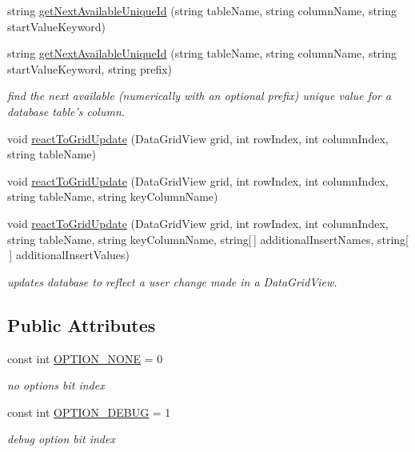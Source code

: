 \begin{DoxyCompactItemize}
string \hyperlink{class_ias_pbx_config_1_1_db_helper_a52df15fe3a440e493b8a082995f9c246}{getNextAvailableUniqueId} (string tableName, string columnName, string startValueKeyword)
\item 
string \hyperlink{class_ias_pbx_config_1_1_db_helper_af6021c5b8518091fd73155119935ebd8}{getNextAvailableUniqueId} (string tableName, string columnName, string startValueKeyword, string prefix)
\begin{DoxyCompactList}\small\item\em find the next available (numerically with an optional prefix) unique value for a database table's column. \item\end{DoxyCompactList}\item 
void \hyperlink{class_ias_pbx_config_1_1_db_helper_a12c26ddcef05d832dccb1643da9d6ba7}{reactToGridUpdate} (DataGridView grid, int rowIndex, int columnIndex, string tableName)
\item 
void \hyperlink{class_ias_pbx_config_1_1_db_helper_a1654a203283dc1ce83552b8466d7e19b}{reactToGridUpdate} (DataGridView grid, int rowIndex, int columnIndex, string tableName, string keyColumnName)
\item 
void \hyperlink{class_ias_pbx_config_1_1_db_helper_a2f4f23f5cdabcac3cdda6e7983bc3d49}{reactToGridUpdate} (DataGridView grid, int rowIndex, int columnIndex, string tableName, string keyColumnName, string\mbox{[}$\,$\mbox{]} additionalInsertNames, string\mbox{[}$\,$\mbox{]} additionalInsertValues)
\begin{DoxyCompactList}\small\item\em updates database to reflect a user change made in a DataGridView. \item\end{DoxyCompactList}\end{DoxyCompactItemize}
\subsection*{Public Attributes}
\begin{DoxyCompactItemize}
\item 
const int \hyperlink{class_ias_pbx_config_1_1_db_helper_a579e32b9a71d8f601e01d6b5a1f98022}{OPTION\_\-NONE} = 0
\begin{DoxyCompactList}\small\item\em no options bit index \item\end{DoxyCompactList}\item 
const int \hyperlink{class_ias_pbx_config_1_1_db_helper_a13592d975c10f3fe39a3577b741efcac}{OPTION\_\-DEBUG} = 1
\begin{DoxyCompactList}\small\item\em debug option bit index \item\end{DoxyCompactList}\end{DoxyCompactItemize}

